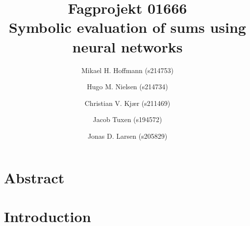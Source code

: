 \documentclass{article}
\title{
    Fagprojekt 01666 \\
    \large{Symbolic evaluation of sums using neural networks}
}
\author{Mikael H. Hoffmann (s214753) \and Hugo M. Nielsen (s214734) \and Christian V. Kjær (s211469) \and Jacob Tuxen (s194572) \and Jonas D. Larsen (s205829)}
\date{}
\begin{document}
\maketitle
\newpage

\section{Abstract}
\newpage

\tableofcontents
\newpage

\section{Introduction}

\end{document}
